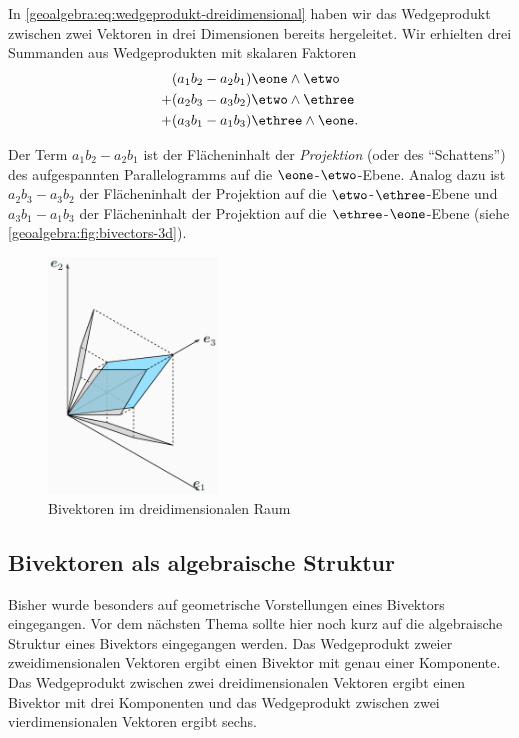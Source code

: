 In \eqref{geoalgebra:eq:wedgeprodukt-dreidimensional} haben wir das Wedgeprodukt zwischen zwei Vektoren
in drei Dimensionen bereits hergeleitet. Wir erhielten drei Summanden aus Wedgeprodukten mit skalaren Faktoren
\begin{align*}
&(a_1 b_2 - a_2 b_1) \eone \wedge \etwo \\
+&(a_2 b_3 - a_3 b_2) \etwo \wedge \ethree \\
+&(a_3 b_1 - a_1 b_3) \ethree \wedge \eone.
\end{align*}

Der Term $a_1 b_2 - a_2 b_1$ ist der Flächeninhalt der \emph{Projektion} (oder des ``Schattens'') des aufgespannten Parallelogramms auf die $\eone$-$\etwo$-Ebene.
Analog dazu ist $a_2 b_3 - a_3 b_2$ der Flächeninhalt der Projektion auf die $\etwo$-$\ethree$-Ebene und $a_3 b_1 - a_1 b_3$ der Flächeninhalt
der Projektion auf die $\ethree$-$\eone$-Ebene (siehe \autoref{geoalgebra:fig:bivectors-3d}).

\begin{figure}[h]
  \centering
  \includegraphics[width=0.4\textwidth]{papers/geoalgebra/assets/bivectors-3d.png}
  \caption{Bivektoren im dreidimensionalen Raum}
  \label{geoalgebra:fig:bivectors-3d}
\end{figure}

\subsection{Bivektoren als algebraische Struktur}
Bisher wurde besonders auf geometrische Vorstellungen eines Bivektors eingegangen. Vor dem nächsten Thema sollte hier noch kurz
auf die algebraische Struktur eines Bivektors eingegangen werden. Das Wedgeprodukt zweier zweidimensionalen Vektoren ergibt
einen Bivektor mit genau einer Komponente. Das Wedgeprodukt zwischen zwei dreidimensionalen Vektoren ergibt einen Bivektor mit drei Komponenten
und das Wedgeprodukt zwischen
zwei vierdimensionalen Vektoren ergibt sechs.

